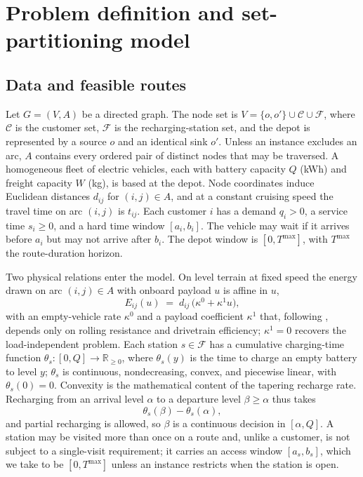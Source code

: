 \documentclass[review,3p,authoryear]{elsarticle}
\theoremstyle{plain}
\theoremstyle{definition}
\theoremstyle{remark}
\newcommand{\Rp}{\mathbb{R}_{\ge 0}}
\newcommand{\C}{\mathcal{C}}
\newcommand{\F}{\mathcal{F}}
\newcommand{\Tmax}{T^{\max}}
\begin{document}
\section{Problem definition and set-partitioning model}
\label{sec:problem}

\subsection{Data and feasible routes}

Let \(G=(V,A)\) be a directed graph. The node set is
\(V=\{o,o'\}\cup\C\cup\F\), where \(\C\) is the customer set, \(\F\) is the
recharging-station set, and the depot is represented by a source \(o\) and an
identical sink \(o'\). Unless an instance excludes an arc, \(A\) contains every
ordered pair of distinct nodes that may be traversed. A homogeneous fleet of
electric vehicles, each with battery capacity \(Q\) (kWh) and freight capacity
\(W\) (kg), is based at the depot. Node coordinates induce Euclidean distances
\(d_{ij}\) for \((i,j)\in A\), and at a constant cruising speed the travel time on
arc \((i,j)\) is \(t_{ij}\). Each customer \(i\) has a demand \(q_i>0\), a service
time \(s_i\ge 0\), and a hard time window \([a_i,b_i]\). The vehicle may wait if it
arrives before \(a_i\) but may not arrive after \(b_i\). The depot window is
\([0,\Tmax]\), with \(\Tmax\) the route-duration horizon.

Two physical relations enter the model. On level terrain at fixed speed the energy
drawn on arc \((i,j)\in A\) with onboard payload \(u\) is affine in \(u\),
\begin{equation}
\label{eq:energy}
E_{ij}(u) \;=\; d_{ij}\,\bigl(\kappa^0 + \kappa^1 u\bigr),
\end{equation}
with an empty-vehicle rate $\kappa^0$ and a payload coefficient $\kappa^1$ that,
following \citet{KancharlaRamadurai2020}, depends only on rolling resistance and
drivetrain efficiency; $\kappa^1=0$ recovers the load-independent problem. Each
station $s\in\F$ has a cumulative charging-time function $\theta_s\colon[0,Q]\to\Rp$,
where $\theta_s(y)$ is the time to charge an empty battery to level \(y\); $\theta_s$
is continuous, nondecreasing, convex, and piecewise linear, with $\theta_s(0)=0$.
Convexity is the mathematical content of the tapering recharge rate. Recharging from
an arrival level $\alpha$ to a departure level $\beta\ge\alpha$ thus takes
\begin{equation}
\label{eq:chargecost}
\theta_s(\beta)-\theta_s(\alpha),
\end{equation}
and partial recharging is allowed, so $\beta$ is a continuous decision in
$[\alpha,Q]$. A station may be visited more than once on a route and, unlike a
customer, is not subject to a single-visit requirement; it carries an access window
$[a_s,b_s]$, which we take to be $[0,\Tmax]$ unless an instance restricts when the
station is open.
\end{document}
